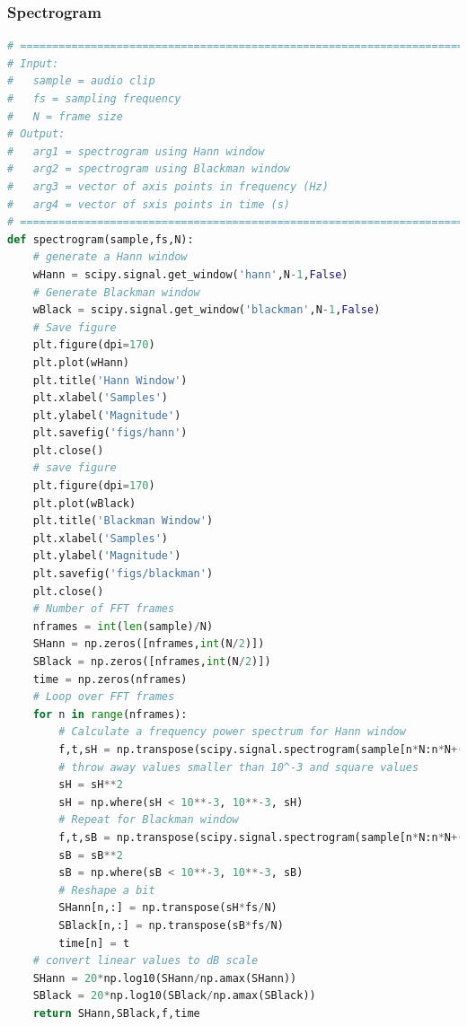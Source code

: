 \documentclass[11pt,a4paper]{article}
\begin{document}
		\subsubsection{Spectrogram} \label{app:spectrogram}
			\begin{lstlisting}[language=Python,label={lst:spectrogram}]
# =============================================================================
# Input:
#   sample = audio clip
#   fs = sampling frequency
#   N = frame size
# Output:
#   arg1 = spectrogram using Hann window
#   arg2 = spectrogram using Blackman window
#   arg3 = vector of axis points in frequency (Hz)
#   arg4 = vector of sxis points in time (s)
# =============================================================================
def spectrogram(sample,fs,N):
    # generate a Hann window
    wHann = scipy.signal.get_window('hann',N-1,False)
    # Generate Blackman window
    wBlack = scipy.signal.get_window('blackman',N-1,False)
    # Save figure
    plt.figure(dpi=170)
    plt.plot(wHann)
    plt.title('Hann Window')
    plt.xlabel('Samples')
    plt.ylabel('Magnitude')
    plt.savefig('figs/hann')
    plt.close()
    # save figure
    plt.figure(dpi=170)
    plt.plot(wBlack)
    plt.title('Blackman Window')
    plt.xlabel('Samples')
    plt.ylabel('Magnitude')
    plt.savefig('figs/blackman')
    plt.close()
    # Number of FFT frames
    nframes = int(len(sample)/N)
    SHann = np.zeros([nframes,int(N/2)])
    SBlack = np.zeros([nframes,int(N/2)])
    time = np.zeros(nframes)
    # Loop over FFT frames
    for n in range(nframes):
        # Calculate a frequency power spectrum for Hann window
        f,t,sH = np.transpose(scipy.signal.spectrogram(sample[n*N:n*N+(N-1)],fs,wHann,mode='magnitude'))
        # throw away values smaller than 10^-3 and square values
        sH = sH**2
        sH = np.where(sH < 10**-3, 10**-3, sH)
        # Repeat for Blackman window
        f,t,sB = np.transpose(scipy.signal.spectrogram(sample[n*N:n*N+(N-1)],fs,wBlack,mode='magnitude'))
        sB = sB**2
        sB = np.where(sB < 10**-3, 10**-3, sB)
        # Reshape a bit
        SHann[n,:] = np.transpose(sH*fs/N)
        SBlack[n,:] = np.transpose(sB*fs/N)
        time[n] = t
    # convert linear values to dB scale
    SHann = 20*np.log10(SHann/np.amax(SHann))
    SBlack = 20*np.log10(SBlack/np.amax(SBlack))
    return SHann,SBlack,f,time
			\end{lstlisting}
\end{document}
